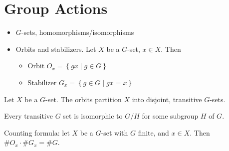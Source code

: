 \documentclass[10pt,letterpaper]{article}
\newcommand{\n}{\hfill\break}
\newcommand{\set}[1]{\left\{#1\right\}}
\begin{document}
\section{Group Actions}

\begin{itemize}
	\item $G$-sets, homomorphisms/isomorphisms
	\item Orbits and stabilizers. Let $X$ be a $G$-set, $x\in{}X$. Then
	\begin{itemize}
		\item Orbit $O_{x}=\set{gx\mid{}g\in{}G}$
		\item Stabilizer $G_{x}=\set{g\in{}G\mid{}gx=x}$
	\end{itemize}
\end{itemize}

\par\noindent
Let $X$ be a $G$-set. The orbits partition $X$ into disjoint, transitive $G$-sets.\n

\par\noindent
Every transitive $G$ set is isomorphic to $G/H$ for some subgroup $H$ of $G$.\n

\par\noindent
Counting formula: let $X$ be a $G$-set with $G$ finite, and $x\in{}X$. Then $\#O_{x}\cdot\#G_{x}=\#G$.
\end{document}
